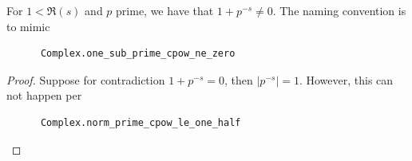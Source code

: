 \begin{theorem}
\label{Complex.one_add_prime_cpow_ne_zero}
\leanok
For $1<\Re(s)$ and $p$ prime, we have that $1+p^{-s}\neq 0$. The naming convention is to mimic
    \begin{verbatim}
      Complex.one_sub_prime_cpow_ne_zero
    \end{verbatim}
\end{theorem}
\begin{proof}
\leanok
Suppose for contradiction $1+p^{-s}=0$, then $|p^{-s}|=1$. However, this can not happen per
    \begin{verbatim}
      Complex.norm_prime_cpow_le_one_half
    \end{verbatim}
\end{proof}
